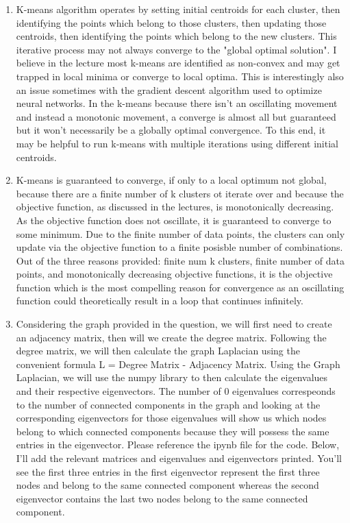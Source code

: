 \documentclass[twoside,10pt]{article}
\begin{document}
\begin{enumerate}
\item K-means algorithm operates by setting initial centroids for each cluster, then identifying the points
which belong to those clusters, then updating those centroids, then identifying the points which belong to
the new clusters. This iterative process may not always converge to the "global optimal solution". I believe
in the lecture most k-means are identified as non-convex and may get trapped in local minima or converge to
local optima. This is interestingly also an issue sometimes with the gradient descent algorithm used to optimize
neural networks. In the k-means because there isn't an oscillating movement and instead a monotonic movement,
a converge is almost all but guaranteed but it won't necessarily be a globally optimal convergence. To this end,
it may be helpful to run k-means with multiple iterations using different initial centroids.

\item K-means is guaranteed to converge, if only to a local optimum not global, because there are a finite
number of k clusters ot iterate over and because the objective function, as discussed in the lectures, is
monotonically decreasing. As the objective function does not oscillate, it is guaranteed to converge to some
minimum. Due to the finite number of data points, the clusters can only update via the objective function
to a finite posisble number of combinations. Out of the three reasons provided: finite num k clusters, finite
number of data points, and monotonically decreasing objective functions, it is the objective function which
is the most compelling reason for convergence as an oscillating function could theoretically result in a loop
that continues infinitely.

\item Considering the graph provided in the question, we will first need to create an adjacency matrix,
then will we create the degree matrix. Following the degree matrix, we will then calculate the
graph Laplacian using the convenient formula L = Degree Matrix - Adjacency Matrix. Using the Graph
Laplacian, we will use the numpy library to then calculate the eigenvalues and their respective eigenvectors.
The number of 0 eigenvalues correspeonds to the number of connected components in the graph and looking
at the corresponding eigenvectors for those eigenvalues will show us which nodes belong to which connected
components because they will possess the same entries in the eigenvector. Please reference the ipynb file
for the code. Below, I'll add the relevant matrices and eigenvalues and eigenvectors printed. You'll see
the first three entries in the first eigenvector represent the first three nodes and belong to the same
connected component whereas the second eigenvector contains the last two nodes belong to the same connected
component.


\end{enumerate}
\end{document}
